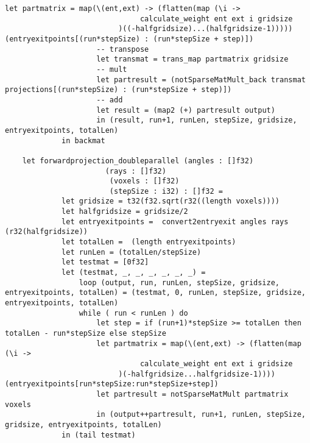 \begin{lstlisting}[language=Futhark]
                     let partmatrix = map(\(ent,ext) -> (flatten(map (\i ->
                               calculate_weight ent ext i gridsize
                          )((-halfgridsize)...(halfgridsize-1))))) (entryexitpoints[(run*stepSize) : (run*stepSize + step)])
                     -- transpose
                     let transmat = trans_map partmatrix gridsize
                     -- mult
                     let partresult = (notSparseMatMult_back transmat projections[(run*stepSize) : (run*stepSize + step)])
                     -- add
                     let result = (map2 (+) partresult output)
                     in (result, run+1, runLen, stepSize, gridsize, entryexitpoints, totalLen)
             in backmat

    let forwardprojection_doubleparallel (angles : []f32)
                       (rays : []f32)
                        (voxels : []f32)
                        (stepSize : i32) : []f32 =
             let gridsize = t32(f32.sqrt(r32((length voxels))))
             let halfgridsize = gridsize/2
             let entryexitpoints =  convert2entryexit angles rays (r32(halfgridsize))
             let totalLen =  (length entryexitpoints)
             let runLen = (totalLen/stepSize)
             let testmat = [0f32]
             let (testmat, _, _, _, _, _, _) =
                 loop (output, run, runLen, stepSize, gridsize, entryexitpoints, totalLen) = (testmat, 0, runLen, stepSize, gridsize, entryexitpoints, totalLen)
                 while ( run < runLen ) do
                     let step = if (run+1)*stepSize >= totalLen then totalLen - run*stepSize else stepSize
                     let partmatrix = map(\(ent,ext) -> (flatten(map (\i ->
                               calculate_weight ent ext i gridsize
                          )(-halfgridsize...halfgridsize-1)))) (entryexitpoints[run*stepSize:run*stepSize+step])
                     let partresult = notSparseMatMult partmatrix voxels
                     in (output++partresult, run+1, runLen, stepSize, gridsize, entryexitpoints, totalLen)
             in (tail testmat)


\end{lstlisting}
